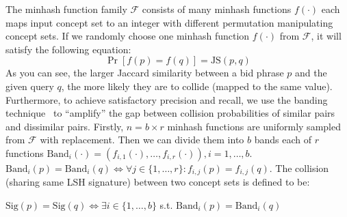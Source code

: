 The minhash function family $\mathcal{F}$ consists of many minhash functions
$f(\cdot)$ each maps input concept set to an integer with different
permutation manipulating concept sets.
If we randomly choose one minhash function $f(\cdot)$ from
$\mathcal{F}$, it will satisfy the following equation:
\begin{equation}
\label{eqn:minhash}
\Pr[f(p)=f(q)]=\text{JS}(p,q)
\end{equation}
As you can see, the larger Jaccard similarity between a bid phrase $p$ and the
given query $q$, the more likely they are to collide (mapped to the same value).
Furthermore, to achieve satisfactory precision and recall, we use the banding
technique~\cite{raja:massivedatasets} to ``amplify'' the gap between 
collision probabilities of similar pairs and dissimilar pairs.
Firstly, $n=b\times{}r$ minhash functions are uniformly sampled from $\mathcal{F}$ with
replacement. 
Then we can divide them into $b$ bands each of $r$ functions 
$\text{Band}_{i}(\cdot)=(f_{i,1}(\cdot),\ldots,f_{i,r}(\cdot)),i=1,\ldots,b$.
$\text{Band}_{i}(p)=\text{Band}_{i}(q)\Leftrightarrow{}\forall{}j\in\{1,\ldots,r\}:f_{i,j}(p)=f_{i,j}(q)$.
The collision (sharing same LSH signature) between two concept sets is
defined to be:
\begin{definition}
\label{def:col}
$\text{Sig}(p)=\text{Sig}(q)\Leftrightarrow{}\exists{}i\in\{1,\ldots,b\}$
s.t. $\text{Band}_{i}(p)=\text{Band}_{i}(q)$
\end{definition}
